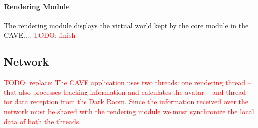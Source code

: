 \documentclass[conference]{acmsiggraph}
\newcommand{\todo}[1]{\textcolor{red}{TODO: #1}}
\begin{document}
\paragraph{Rendering Module}
The rendering module displays the virtual world kept by the core module in the CAVE.... \todo{finish}


\subsection{Network}
\label{SEC:NETWORK}

\todo{replace: The CAVE application uses two threads: one rendering thread -- that also processes tracking information and calculates the avatar -- and thread for data reception from the Dark Room. Since the information received over the network must be shared with the rendering module we must synchronize the local data of both the threads.}
\end{document}
